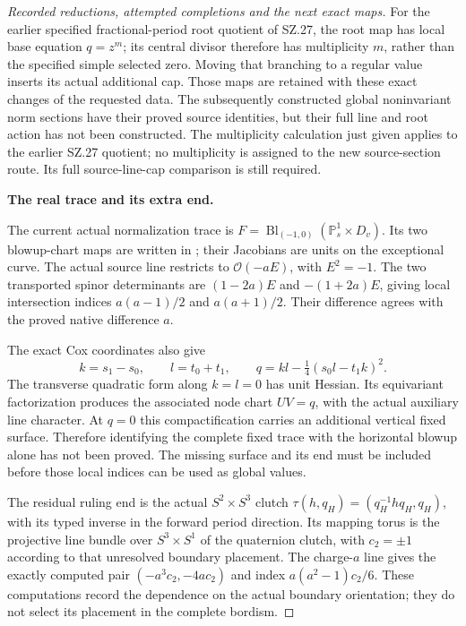 \begin{proof}[Recorded reductions, attempted completions and the next exact maps]
For the earlier specified fractional-period root quotient
of SZ.27, the root map has local base equation \(q=z^m\);
its central
divisor therefore has multiplicity \(m\), rather than the
specified simple selected zero. Moving that branching to a
regular value inserts its actual additional cap. Those maps
are retained with these exact changes of the requested data.
The subsequently constructed global noninvariant norm sections
have their proved source identities, but their full line and
root action has not been constructed. The multiplicity
calculation just given applies to the earlier SZ.27 quotient;
no multiplicity is assigned to the new source-section route.
Its full source-line-cap comparison is still required.

\par\medskip\noindent\textbf{The real trace and its extra end.}\par\nopagebreak[4]
The current actual normalization trace is
\(F=\operatorname{Bl}_{(-1,0)}(\mathbb P^1_s\times D_v)\).
Its two blowup-chart maps are written in
; their
Jacobians are units on the exceptional curve. The actual
source line restricts to \(\mathcal O(-aE)\), with
\(E^2=-1\). The two transported spinor determinants are
\((1-2a)E\) and \(-(1+2a)E\), giving local intersection
indices \(a(a-1)/2\) and \(a(a+1)/2\). Their difference
agrees with the proved native difference \(a\).

The exact Cox coordinates also give
\[
 k=s_1-s_0,\qquad l=t_0+t_1,\qquad
 q=kl-\tfrac14(s_0l-t_1k)^2.
\]
The transverse quadratic form along \(k=l=0\) has unit
Hessian. Its equivariant factorization produces the associated
node chart \(UV=q\), with the actual auxiliary line character.
At \(q=0\) this compactification carries an additional
vertical fixed surface. Therefore identifying the complete
fixed trace with the horizontal blowup alone has not been
proved. The missing surface and its end must be included
before those local indices can be used as global values.

The residual ruling end is the actual
\(S^2\times S^3\) clutch
\(\tau(h,q_H)=(q_H^{-1}h q_H,q_H)\), with its typed inverse
in the forward period direction. Its mapping torus is the
projective line bundle over \(S^3\times S^1\) of the
quaternion clutch, with \(c_2=\pm1\) according to that
unresolved boundary placement. The charge-\(a\) line gives
the exactly computed pair \((-a^3c_2,-4ac_2)\) and index
\(a(a^2-1)c_2/6\). These computations record the dependence
on the actual boundary orientation; they do not select its
placement in the complete bordism.


\end{proof}
